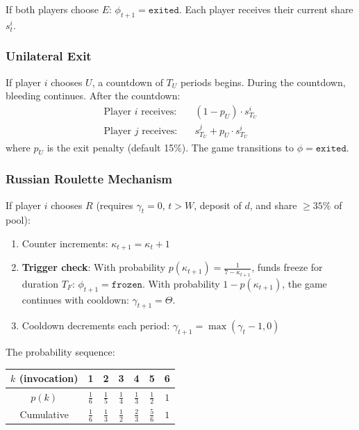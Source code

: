\documentclass[12pt,a4paper]{article}
\begin{document}
If both players choose $E$: $\phi_{t+1} = \texttt{exited}$. Each player receives their current share $s_t^i$.

\subsubsection{Unilateral Exit}

If player $i$ chooses $U$, a countdown of $T_U$ periods begins. During the countdown, bleeding continues. After the countdown:
\begin{align}
\text{Player } i \text{ receives:} &\quad (1 - p_U) \cdot s_{T_U}^i \label{eq:unilateral-exit} \\
\text{Player } j \text{ receives:} &\quad s_{T_U}^j + p_U \cdot s_{T_U}^i
\end{align}
where $p_U$ is the exit penalty (default 15\%). The game transitions to $\phi = \texttt{exited}$.

\subsubsection{Russian Roulette Mechanism}
\label{sec:rr-def}

If player $i$ chooses $R$ (requires $\gamma_t = 0$, $t > W$, deposit of $d$, and share $\geq 35\%$ of pool):

\begin{enumerate}
    \item Counter increments: $\kappa_{t+1} = \kappa_t + 1$
    \item \textbf{Trigger check}: With probability $p(\kappa_{t+1}) = \frac{1}{7 - \kappa_{t+1}}$, funds freeze for duration $T_F$:
    $\phi_{t+1} = \texttt{frozen}$.
    With probability $1 - p(\kappa_{t+1})$, the game continues with cooldown:
    $\gamma_{t+1} = \Theta$.
    \item Cooldown decrements each period: $\gamma_{t+1} = \max(\gamma_t - 1, 0)$
\end{enumerate}

The probability sequence:
\begin{center}
\begin{tabular}{c|cccccc}
$k$ (invocation) & 1 & 2 & 3 & 4 & 5 & 6 \\
\hline
$p(k)$ & $\frac{1}{6}$ & $\frac{1}{5}$ & $\frac{1}{4}$ & $\frac{1}{3}$ & $\frac{1}{2}$ & $1$ \\
Cumulative & $\frac{1}{6}$ & $\frac{1}{3}$ & $\frac{1}{2}$ & $\frac{2}{3}$ & $\frac{5}{6}$ & $1$
\end{tabular}
\end{center}
\end{document}
